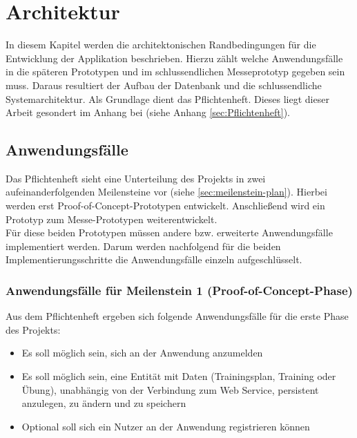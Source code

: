 \chapter{Architektur}
\label{cha:architektur}
In diesem Kapitel werden die architektonischen Randbedingungen für die Entwicklung der Applikation beschrieben. Hierzu zählt welche Anwendungsfälle in die späteren Prototypen und im schlussendlichen Messeprototyp gegeben sein muss. Daraus resultiert der Aufbau der Datenbank und die schlussendliche Systemarchitektur. Als Grundlage dient das Pflichtenheft. Dieses liegt dieser Arbeit gesondert im Anhang bei (siehe Anhang \ref{sec:Pflichtenheft}).

\section{Anwendungsfälle}
\label{sec:anwendungsfaelle}
Das Pflichtenheft sieht eine Unterteilung des Projekts in zwei aufeinanderfolgenden Meilensteine vor (siehe \ref{sec:meilenstein-plan}). Hierbei werden erst Proof-of-Concept-Prototypen entwickelt. Anschließend wird ein Prototyp zum Messe-Prototypen weiterentwickelt. \\
Für diese beiden Prototypen müssen andere bzw. erweiterte Anwendungsfälle implementiert werden. Darum werden nachfolgend für die beiden Implementierungsschritte die Anwendungsfälle einzeln aufgeschlüsselt. 
\subsection{Anwendungsfälle für Meilenstein 1 (Proof-of-Concept-Phase)}
\label{ssec:anwendungsfaelle-poc}
Aus dem Pflichtenheft ergeben sich folgende Anwendungsfälle für die erste Phase des Projekts:
\begin{itemize}
\item Es soll möglich sein, sich an der Anwendung anzumelden
\item Es soll möglich sein, eine Entität mit Daten (Trainingsplan, Training oder Übung), unabhängig von der Verbindung zum Web Service, persistent anzulegen, zu ändern und zu speichern
\item Optional soll sich ein Nutzer an der Anwendung registrieren können
\end{itemize}

